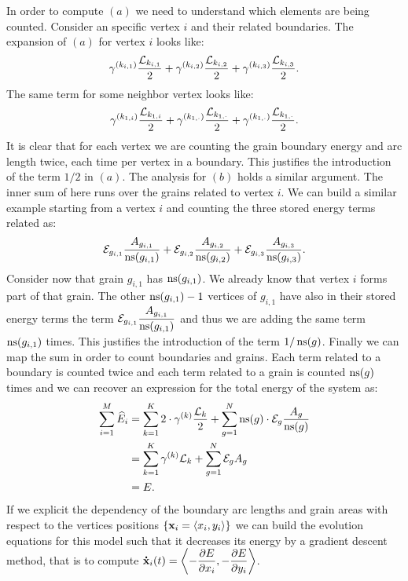  In order to compute $(a)$ we need to understand which elements are being counted. Consider an specific vertex $i$ and their related boundaries. The expansion of $(a)$ for vertex $i$ looks like:
\begin{equation*}
    \gamma^{(k_{i,1})}\frac{\mathcal{L}_{k_{i,1}}}{2} + \gamma^{(k_{i,2})}\frac{\mathcal{L}_{k_{i,2}}}{2} + \gamma^{(k_{i,3})}\frac{\mathcal{L}_{k_{i,3}}}{2}.
\end{equation*}
The same term for some neighbor vertex looks like:
\begin{equation*}
    \gamma^{(k_{1,i})}\frac{\mathcal{L}_{k_{1,i}}}{2} +
    \gamma^{(k_{1,\cdot})}\frac{\mathcal{L}_{k_{1,\cdot}}}{2} +
    \gamma^{(k_{1,\cdot})}\frac{\mathcal{L}_{k_{1,\cdot}}}{2}.
\end{equation*}
%
It is clear that for each vertex we are counting the grain boundary energy and arc length twice, each time per vertex in a boundary. 
This justifies the introduction of the term $1/2$ in $(a)$. The analysis for $(b)$ holds a similar argument. 
The inner sum of here runs over the grains related to vertex $i$.  We can build a similar example starting from a vertex $i$ and counting the three stored energy terms related as:
\begin{equation*}
    \mathcal{E}_{g_{i,1}}\frac{A_{g_{i,1}}}{\operatorname{ns}(g_{i,1})} + \mathcal{E}_{g_{i,2}}\frac{A_{g_{i,2}}}{\operatorname{ns}(g_{i,2})} +
    \mathcal{E}_{g_{i,3}}\frac{A_{g_{i,3}}}{\operatorname{ns}(g_{i,3})}.
\end{equation*}
Consider now that grain $g_{i,1}$ has $\operatorname{ns}(g_{i,1})$. We already know that vertex $i$ forms part of that grain. The other $\operatorname{ns}(g_{i,1})-1$ vertices of $g_{i,1}$ have also in their stored energy terms the term $\mathcal{E}_{g_{i,1}}\dfrac{A_{g_{i,1}}}{\operatorname{ns}(g_{i,1})}$ and thus we are adding the same term $\operatorname{ns}(g_{i,1})$ times. This justifies the introduction of the term $1/\operatorname{ns}(g)$. Finally we can map the sum in order to count boundaries and grains. 
Each term related to a boundary is counted twice and each term related to a grain is counted $\operatorname{ns}(g)$ times and we can recover an expression for the total energy of the system as:
\begin{align*}
    \sum_{i=1}^{M} \widehat{E}_i &= \sum_{k=1}^{K} 2 \cdot \gamma^{(k)} \frac{\mathcal{L}_{k}}{2} + \sum_{g=1}^{N} \operatorname{ns}(g)\cdot\mathcal{E}_{g}\frac{A_g}{\operatorname{ns}(g)}\\
    &= \sum_{k=1}^{K} \gamma^{(k)} \mathcal{L}_{k} + \sum_{g=1}^{N} \mathcal{E}_{g} A_g\\
    &= E.
\end{align*}
If we explicit the dependency of the boundary arc lengths and grain areas with respect to the vertices positions $\{\x_i=\langle x_i,y_i\rangle\}$ we can build the evolution equations for this model such that it decreases its energy by a gradient descent method, that is to compute $\dotx_{i}(t) = \left\langle -\dfrac{\partial E}{\partial x_i}, -\dfrac{\partial E}{\partial y_i}\right\rangle$.

